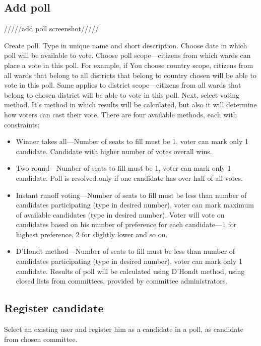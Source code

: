 \documentclass[a4paper,twoside,12pt]{book}
\begin{document}
    \subsection{Add poll}

      /////add poll screenshot/////

      Create poll. Type in unique name and short description. Choose date in which poll will be available to vote.
      Choose poll scope---citizens from which wards can place a vote in this poll.
      For example, if You choose country scope, citizens from all wards that belong to all districts that belong to country chosen will be able to vote in this poll.
      Same applies to district scope---citizens from all wards that belong to chosen district will be able to vote in this poll.
      Next, select voting method. It's method in which results will be calculated, but also it will determine how voters can cast their vote.
      There are four available methods, each with constraints:
      \begin{itemize}
        \item Winner takes all---Number of seats to fill must be 1, voter can mark only 1 candidate. Candidate with higher number of votes overall wins.
        \item Two round---Number of seats to fill must be 1, voter can mark only 1 candidate. Poll is resolved only if one candidate has over half of all votes.
        \item Instant runoff voting---Number of seats to fill must be less than number of candidates participating (type in desired number),
        voter can mark maximum of available candidates (type in desired number).
        Voter will vote on candidates based on his number of preference for each candidate---1 for highest preference, 2 for slightly lower and so on.
        \item D'Hondt method---Number of seats to fill must be less than number of candidates participating (type in desired number),
        voter can mark only 1 candidate. Results of poll will be calculated using D'Hondt method, using closed lists from committees, provided by committee administrators.
      \end{itemize}

    \subsection{Register candidate}
      Select an existing user and register him as a candidate in a poll, as candidate from chosen committee.
\end{document}
